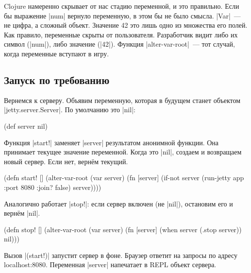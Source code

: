 Clojure намеренно скрывает от нас стадию переменной, и это правильно. Если бы
выражение \spverb|num| вернуло переменную, в этом бы не было смысла. \spverb|Var|~---
не цифра, а сложный объект. Значение 42 это лишь одно из множества его полей.
Как правило, переменные скрыты от пользователя. Разработчик видит либо их символ
(\spverb|num|), либо значение (\spverb|42|). Функция \spverb|alter-var-root|~---
тот случай, когда переменные вступают в игру.

\subsection{Запуск по требованию}

Вернемся к серверу. Объявим переменную, которая в будущем станет объектом
\spverb|jetty.server.Server|. По умолчанию это \spverb|nil|:

\begin{english}
  \begin{clojure}
(def server nil)
  \end{clojure}
\end{english}

Функция \spverb|start!| заменяет \spverb|server| результатом анонимной
функции. Она принимает текущее значение переменной. Когда это \spverb|nil|,
создаем и возвращаем новый сервер. Если нет, верн\"{е}м текущий.

\begin{english}
  \begin{clojure}
(defn start! []
  (alter-var-root
   (var server)
   (fn [server]
     (if-not server
       (run-jetty app {:port 8080 :join? false})
       server))))
  \end{clojure}
\end{english}

\noindent
Аналогично работает \spverb|stop!|: если сервер включен (не \spverb|nil|),
остановим его и верн\"{е}м \spverb|nil|.

\begin{english}
  \begin{clojure}
(defn stop! []
  (alter-var-root
   (var server)
   (fn [server]
     (when server
       (.stop server))
     nil)))
  \end{clojure}
\end{english}

Вызов \spverb|(start!)| запустит сервер в фоне. Браузер ответит на запросы по
адресу localhost:8080. Переменная \spverb|server| напечатает в REPL объект
сервера.

